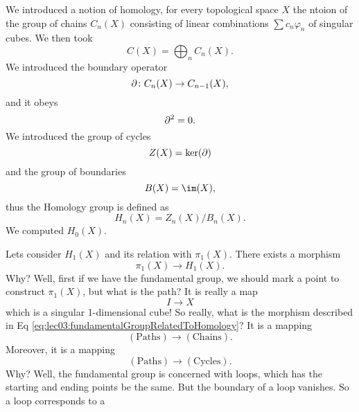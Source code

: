 
We introduced a notion of homology, for every topological space
$X$ the ntoion of the group of chains $C_{n}(X)$ consisting of
linear combinations $\sum c_n\varphi_n$ of singular cubes. We
then took
\begin{equation}
C(X)=\bigoplus_{n}C_{n}(X).
\end{equation}
We introduced the boundary operator
\begin{equation}
\partial\colon C_{n}(X)\to C_{n-1}(X),
\end{equation}
and it obeys
\begin{equation}
\partial^2=0.
\end{equation}
We introduced the group of cycles
\begin{equation}
Z(X)=\ker(\partial)
\end{equation}
and the group of boundaries
\begin{equation}
B(X)=\im(X),
\end{equation}
thus the Homology group is defined as
\begin{equation}
H_{n}(X)=Z_{n}(X)/B_{n}(X).
\end{equation}
We computed $H_{0}(X)$.

Lets consider $H_{1}(X)$ and its relation with
$\pi_{1}(X)$. There exists a morphism 
\begin{equation}\label{eq:lec03:fundamentalGroupRelatedToHomology}
\pi_{1}(X)\to H_{1}(X). 
\end{equation}
Why? Well, first if we have the fundamental group, we
should mark a point to construct $\pi_{1}(X)$, but what is the
path? It is really a map
\begin{equation}
I\to X
\end{equation}
which is a singular 1-dimensional cube! So really, what is the
morphism described in Eq \eqref{eq:lec03:fundamentalGroupRelatedToHomology}?
It is a mapping
\begin{equation}
(\mbox{Paths})\to(\mbox{Chains}).
\end{equation}
Moreover, it is a mapping
\begin{equation}
(\mbox{Paths})\to(\mbox{Cycles}).
\end{equation}
Why? Well, the fundamental group is concerned with loops, which
has the starting and ending points be the same. But the boundary
of a loop vanishes. So a loop corresponds to a

